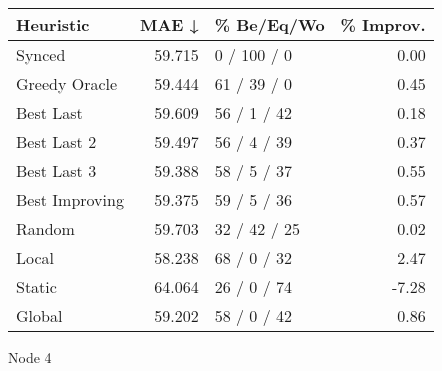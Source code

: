 \begin{tabular}{lrlr}
\toprule
\textbf{Heuristic} & \textbf{MAE ↓} & \textbf{\% Be/Eq/Wo} & \textbf{\% Improv.} \\
\midrule
            Synced &         59.715 &          0 / 100 / 0 &                0.00 \\
     Greedy Oracle &         59.444 &          61 / 39 / 0 &                0.45 \\
         Best Last &         59.609 &          56 / 1 / 42 &                0.18 \\
       Best Last 2 &         59.497 &          56 / 4 / 39 &                0.37 \\
       Best Last 3 &         59.388 &          58 / 5 / 37 &                0.55 \\
    Best Improving &         59.375 &          59 / 5 / 36 &                0.57 \\
            Random &         59.703 &         32 / 42 / 25 &                0.02 \\
             Local &         58.238 &          68 / 0 / 32 &                2.47 \\
            Static &         64.064 &          26 / 0 / 74 &               -7.28 \\
            Global &         59.202 &          58 / 0 / 42 &                0.86 \\
\bottomrule
\end{tabular}
\caption{Node 4}
\label{tab:iid_lr01_le1_bs4_4}
